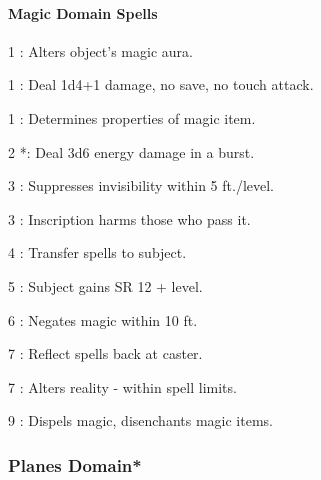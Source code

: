 \paragraph{Magic Domain Spells}
\begin{list}{}{\leftmargin=1em}
\item[1] : Alters object's magic aura.
\item[1] : Deal 1d4+1 damage, no save, no touch attack.
\item[1] : Determines properties of magic item.
\item[2] *: Deal 3d6 energy damage in a burst.
\item[3] : Suppresses invisibility within 5 ft./level.
\item[3] : Inscription harms those who pass it.
\item[4] : Transfer spells to subject.
\item[5] : Subject gains SR 12 + level.
\item[6] : Negates magic within 10 ft.
\item[7] : Reflect spells back at caster.
\item[7] : Alters reality - within spell limits.
\item[9] : Dispels magic, disenchants magic items.
\end{list}
\subsubsection[Planes Domain]{Planes Domain*}
